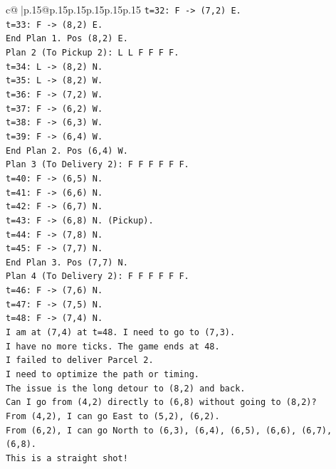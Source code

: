 \documentclass{article}
\begin{document}
{\begin{supertabular}{c@{$\;$}|p{.15\linewidth}@{}p{.15\linewidth}p{.15\linewidth}p{.15\linewidth}p{.15\linewidth}p{.15\linewidth}}
{{{\texttt{t=32: F {-}> (7,2) E.} \\
\texttt{t=33: F {-}> (8,2) E.} \\
\texttt{End Plan 1. Pos (8,2) E.} \\
\texttt{Plan 2 (To Pickup 2): L L F F F F.} \\
\texttt{t=34: L {-}> (8,2) N.} \\
\texttt{t=35: L {-}> (8,2) W.} \\
\texttt{t=36: F {-}> (7,2) W.} \\
\texttt{t=37: F {-}> (6,2) W.} \\
\texttt{t=38: F {-}> (6,3) W.} \\
\texttt{t=39: F {-}> (6,4) W.} \\
\texttt{End Plan 2. Pos (6,4) W.} \\
\texttt{Plan 3 (To Delivery 2): F F F F F F.} \\
\texttt{t=40: F {-}> (6,5) N.} \\
\texttt{t=41: F {-}> (6,6) N.} \\
\texttt{t=42: F {-}> (6,7) N.} \\
\texttt{t=43: F {-}> (6,8) N. (Pickup).} \\
\texttt{t=44: F {-}> (7,8) N.} \\
\texttt{t=45: F {-}> (7,7) N.} \\
\texttt{End Plan 3. Pos (7,7) N.} \\
\texttt{Plan 4 (To Delivery 2): F F F F F F.} \\
\texttt{t=46: F {-}> (7,6) N.} \\
\texttt{t=47: F {-}> (7,5) N.} \\
\texttt{t=48: F {-}> (7,4) N.} \\
\texttt{I am at (7,4) at t=48. I need to go to (7,3).} \\
\texttt{I have no more ticks. The game ends at 48.} \\
\texttt{I failed to deliver Parcel 2.} \\
\texttt{I need to optimize the path or timing.} \\
\texttt{The issue is the long detour to (8,2) and back.} \\
\texttt{Can I go from (4,2) directly to (6,8) without going to (8,2)?} \\
\texttt{From (4,2), I can go East to (5,2), (6,2).} \\
\texttt{From (6,2), I can go North to (6,3), (6,4), (6,5), (6,6), (6,7), (6,8).} \\
\texttt{This is a straight shot!} \\
}}}
\end{supertabular}}
\end{document}
